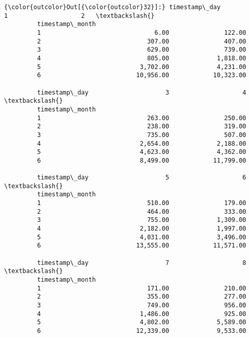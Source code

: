 \documentclass[11pt]{article}
\begin{document}
\begin{Verbatim}[commandchars=\\\{\}]
{\color{outcolor}Out[{\color{outcolor}32}]:} timestamp\_day                     1                    2   \textbackslash{}
         timestamp\_month                                             
         1                               6.00               122.00   
         2                             307.00               407.00   
         3                             629.00               739.00   
         4                             805.00             1,818.00   
         5                           3,702.00             4,231.00   
         6                          10,956.00            10,323.00   
         
         timestamp\_day                     3                    4   \textbackslash{}
         timestamp\_month                                             
         1                             263.00               250.00   
         2                             238.00               319.00   
         3                             735.00               507.00   
         4                           2,654.00             2,188.00   
         5                           4,623.00             4,362.00   
         6                           8,499.00            11,799.00   
         
         timestamp\_day                     5                    6   \textbackslash{}
         timestamp\_month                                             
         1                             510.00               179.00   
         2                             464.00               333.00   
         3                             755.00             1,309.00   
         4                           2,182.00             1,997.00   
         5                           4,031.00             3,496.00   
         6                          13,555.00            11,571.00   
         
         timestamp\_day                     7                    8   \textbackslash{}
         timestamp\_month                                             
         1                             171.00               210.00   
         2                             355.00               277.00   
         3                             749.00               956.00   
         4                           1,486.00               925.00   
         5                           4,802.00             5,589.00   
         6                          12,339.00             9,533.00   
         

\end{Verbatim}
\end{document}
